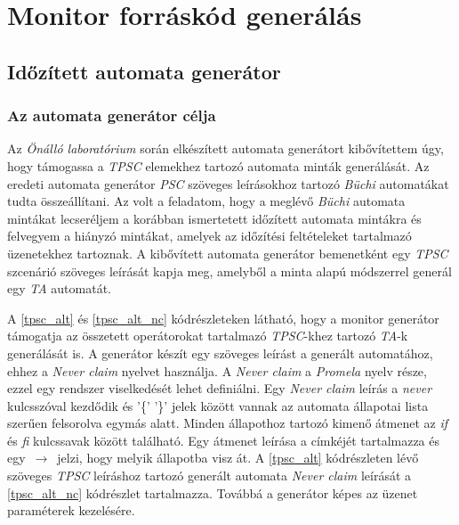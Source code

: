 \chapter{Monitor forráskód generálás}\section{Időzített automata generátor}

\subsection{Az automata generátor célja}

Az \textit{Önálló laboratórium} során elkészített automata generátort kibővítettem úgy, hogy támogassa a \textit{TPSC} elemekhez tartozó automata minták generálását.
Az eredeti automata generátor \textit{PSC} szöveges leírásokhoz tartozó \textit{Büchi} automatákat tudta összeállítani.
Az volt a feladatom, hogy a meglévő \textit{Büchi} automata mintákat lecseréljem a korábban ismertetett időzített automata mintákra és felvegyem a hiányzó mintákat, amelyek az időzítési feltételeket tartalmazó üzenetekhez tartoznak.
A kibővített automata generátor bemenetként egy \textit{TPSC} szcenárió szöveges leírását kapja meg, amelyből a minta alapú módszerrel generál egy \textit{TA} automatát.

A \ref{tpsc_alt} és \ref{tpsc_alt_nc} kódrészleteken látható, hogy a monitor generátor támogatja az összetett operátorokat tartalmazó \textit{TPSC}-khez tartozó \textit{TA}-k generálását is.
A generátor készít egy szöveges leírást a generált automatához, ehhez a \textit{Never claim} nyelvet használja.
A \textit{Never claim} \cite{NeverClaim} a \textit{Promela} nyelv része, ezzel egy rendszer viselkedését lehet definiálni.
Egy \textit{Never claim} leírás a \textit{never} kulcsszóval kezdődik és '\{' '\}' jelek között vannak az automata állapotai lista szerűen felsorolva egymás alatt.
Minden állapothoz tartozó kimenő átmenet az \textit{if} és \textit{fi} kulcssavak között található.
Egy átmenet leírása a címkéjét tartalmazza és egy \textit{$\,\to\,$} jelzi, hogy melyik állapotba visz át.
A \ref{tpsc_alt} kódrészleten lévő szöveges \textit{TPSC} leíráshoz tartozó generált automata \textit{Never claim} leírását a \ref{tpsc_alt_nc} kódrészlet tartalmazza.
Továbbá a generátor képes az üzenet paraméterek kezelésére.

